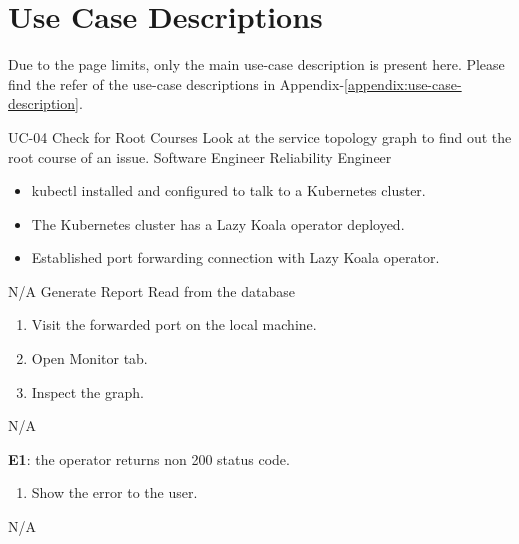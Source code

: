 \newenvironment{CompactItemizes}
{ \vspace{-8mm}\begin{itemize}[leftmargin=*,noitemsep,nolistsep]}
{ \vspace{-7mm}\end{itemize}} 

\newenvironment{CompactEnumerate}
{ \vspace{-8mm}\begin{enumerate}[leftmargin=*,noitemsep,nolistsep]}
{ \vspace{-7mm}\end{enumerate}} 


\section{Use Case Descriptions}
Due to the page limits, only the main use-case description is present here. Please find the refer  of the use-case descriptions in Appendix-\ref{appendix:use-case-description}.

\vspace{-2em}
\UseCaseDescription
{UC-04}
{Check for Root Courses}
{Look at the service topology graph to find out the root course of an issue.}
{Software Engineer\newline
Reliability Engineer}
{\begin{CompactItemizes}
    \item kubectl installed and configured to talk to a Kubernetes cluster.
    \item The Kubernetes cluster has a Lazy Koala operator deployed.
    \item Established port forwarding connection with Lazy Koala operator.
\end{CompactItemizes}}
{N/A}
{Generate Report\newline
Read from the database}
{\begin{CompactEnumerate}
    \item Visit the forwarded port on the local machine.
    \item Open Monitor tab.
    \item Inspect the graph.
\end{CompactEnumerate}}
{{N/A}
{\textbf{E1}: the operator returns non 200 status code.
\vspace{-4mm}\begin{enumerate}
    \item Show the error to the user.
\vspace{-7mm}\end{enumerate}}
{N/A}}


